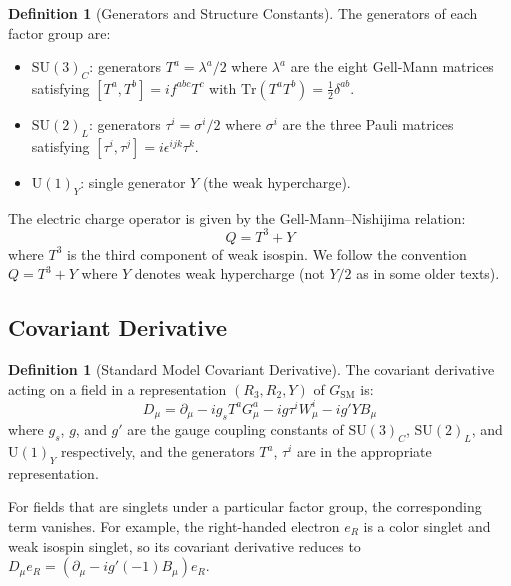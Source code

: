 \documentclass[12pt]{article}
\theoremstyle{definition}
\newtheorem{definition}[theorem]{Definition}
\theoremstyle{remark}
\begin{document}
\begin{definition}[Generators and Structure Constants]
\label{def:generators}
The generators of each factor group are:
\begin{itemize}
    \item $\mathrm{SU}(3)_C$: generators $T^a = \lambda^a / 2$ where $\lambda^a$ are the eight Gell-Mann matrices satisfying $[T^a, T^b] = i f^{abc} T^c$ with $\mathrm{Tr}(T^a T^b) = \frac{1}{2}\delta^{ab}$.
    \item $\mathrm{SU}(2)_L$: generators $\tau^i = \sigma^i / 2$ where $\sigma^i$ are the three Pauli matrices satisfying $[\tau^i, \tau^j] = i \epsilon^{ijk} \tau^k$.
    \item $\mathrm{U}(1)_Y$: single generator $Y$ (the weak hypercharge).
\end{itemize}
\end{definition}

The electric charge operator is given by the Gell-Mann--Nishijima relation:
\begin{equation}
\label{eq:gellmann-nishijima}
Q = T^3 + Y
\end{equation}
where $T^3$ is the third component of weak isospin. We follow the convention $Q = T^3 + Y$ where $Y$ denotes weak hypercharge (not $Y/2$ as in some older texts).

\subsection{Covariant Derivative}

\begin{definition}[Standard Model Covariant Derivative]
\label{def:covariantderiv}
The covariant derivative acting on a field in a representation $(R_3, R_2, Y)$ of $G_{\mathrm{SM}}$ is:
\begin{equation}
\label{eq:covariantderiv}
D_\mu = \partial_\mu - i g_s T^a G^a_\mu - i g \tau^i W^i_\mu - i g' Y B_\mu
\end{equation}
where $g_s$, $g$, and $g'$ are the gauge coupling constants of $\mathrm{SU}(3)_C$, $\mathrm{SU}(2)_L$, and $\mathrm{U}(1)_Y$ respectively, and the generators $T^a$, $\tau^i$ are in the appropriate representation.
\end{definition}

For fields that are singlets under a particular factor group, the corresponding term vanishes. For example, the right-handed electron $e_R$ is a color singlet and weak isospin singlet, so its covariant derivative reduces to $D_\mu e_R = (\partial_\mu - i g'(-1) B_\mu) e_R$.
\end{document}

